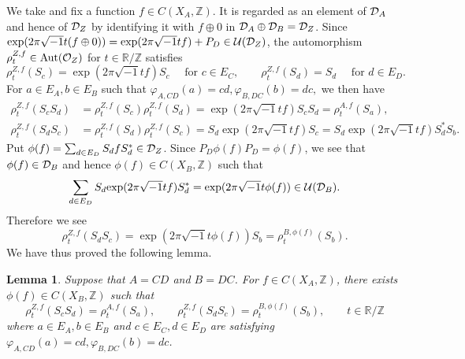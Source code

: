 \documentclass[11pt]{article}
\newtheorem{lemma}[theorem]{Lemma}
\theoremstyle{plain}
\theoremstyle{definition}
\numberwithin{equation}{section}
\newcommand{\RZ}{\mathbb{R}/{\mathbb{Z}}}
\newcommand{\Z}{\mathbb{Z}}
\begin{document}
We take and fix a function $f \in C(X_A,\Z)$.
It is regarded as an element of 
${{\mathcal{D}}_A}$ and hence of ${{\mathcal{D}}_Z}$
by identifying it with 
$f\oplus 0$ in ${{\mathcal{D}}_A} \oplus {{\mathcal{D}}_B} = {{\mathcal{D}}_Z}$.
Since
$
 {{\operatorname{exp}}}{(2\pi\sqrt{-1}t (f\oplus 0))}
 ={{\operatorname{exp}}}{(2\pi\sqrt{-1}t f)} +P_D
 \in {{\mathcal{U}}}({{\mathcal{D}}_Z})$,
the automorphism
$\rho^{Z,f}_t \in {{\operatorname{Aut}}}({{\mathcal{O}}_Z})$
for $t \in \RZ$ 
satisfies
\begin{equation}
\rho^{Z,f}_t(S_c) = \exp{(2\pi\sqrt{-1}t f)}S_c
\quad \text{ for } c \in E_C,\qquad
\rho^{Z,f}_t(S_d) = S_d
\quad \text{ for } d \in E_D.
\end{equation}
For $a \in E_A, b \in E_B$ such that
$
\varphi_{A,CD}(a) = cd,
\varphi_{B,DC}(b) = dc,$
we then have
\begin{align*}
\rho^{Z,f}_t(S_c S_d) 
& =\rho^{Z,f}_t(S_c)\rho^{Z,f}_t(S_d) 
 =\exp{(2\pi\sqrt{-1}t f)} S_c S_d 
 =\rho^{A,f}_t(S_{a}), \\ 
\rho^{Z,f}_t(S_d S_c) 
& =\rho^{Z,f}_t(S_d)\rho^{Z,f}_t(S_c) 
 = S_d \exp{(2\pi\sqrt{-1}t f)} S_c  
 = S_d \exp{(2\pi\sqrt{-1}t f)} S_d^* S_{b}.
\end{align*} 
Put 
$\phi(f) = \sum_{d\in E_D}S_d f S_d^* \in {{\mathcal{D}}_Z}$.
Since 
$P_D \phi(f) P_D = \phi(f)$,
we see that
$\phi(f) \in {{\mathcal{D}}_B}$ and hence $\phi(f) \in C(X_B,\Z)$ 
such that 
\begin{equation*}
\sum_{d \in E_D}S_d {{\operatorname{exp}}}{(2\pi\sqrt{-1}t f)}S_d^*
=
{{\operatorname{exp}}}{(2\pi\sqrt{-1}t\phi(f))} \in {{\mathcal{U}}}({{\mathcal{D}}_B}).
\end{equation*}
Therefore we see
\begin{equation*}
\rho^{Z,f}_t(S_d S_c)  
=\exp{(2\pi\sqrt{-1}t \phi(f))} S_{b}
=\rho^{B,\phi(f)}_t (S_{b}).
\end{equation*}
We have thus proved the following lemma.
\begin{lemma}
Suppose that 
$A = CD$ and $B =DC$.
For $f \in C(X_A,\Z)$,
there exists 
$\phi(f) \in C(X_B,\Z)$
such that 
\begin{equation}
\rho^{Z,f}_t(S_c S_d) =\rho^{A,f}_t(S_{a}), \qquad
\rho^{Z,f}_t(S_d S_c) =\rho^{B,\phi(f)}_t(S_{b}),
\qquad t \in \RZ \label{eq:rhozf}
\end{equation}
where
$a \in E_A, b \in E_B$
and
$c \in E_C, d\in E_D$
are satisfying
$
\varphi_{A,CD}(a) = cd,
\varphi_{B,DC}(b) = dc$.
\end{lemma}
\end{document}
